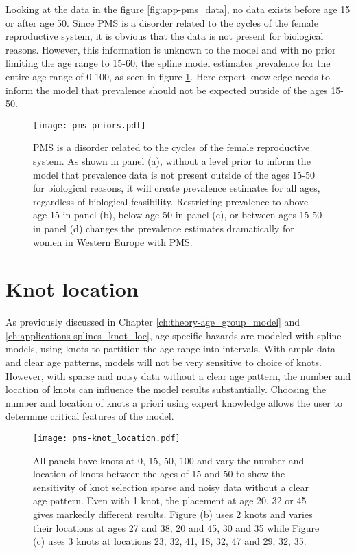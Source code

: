 Looking at the data in the figure \ref{fig:app-pms_data}, no data exists before age 15 or after age 50.  Since PMS is a disorder related to the cycles of the female reproductive system, it is obvious that the data is not present for biological reasons.  However, this information is unknown to the model and with no prior limiting the age range to 15-60, the spline model estimates prevalence for the entire age range of 0-100, as seen in figure \ref{fig:app-prios_on_level}.  Here expert knowledge needs to inform the model that prevalence should not be expected outside of the ages 15-50.

    \begin{figure}
        \begin{center}
            \texttt{[image: pms-priors.pdf]}
        \end{center}
        \caption{PMS is a disorder related to the cycles of the female reproductive system.  As shown in panel (a), without a level prior to inform the model that prevalence data is not present outside of the ages 15-50 for biological reasons, it will create prevalence estimates for all ages, regardless of biological feasibility.  Restricting prevalence to above age 15 in panel (b), below age 50 in panel (c), or between ages 15-50 in panel (d) changes the prevalence estimates dramatically for women in Western Europe with PMS.}
        \label{fig:app-prios_on_level}
    \end{figure}

\section{Knot location}
As previously discussed in Chapter \ref{ch:theory-age_group_model} and \ref{ch:applications-splines_knot_loc}, age-specific hazards are modeled with spline models, using knots to partition the age range into intervals.  With ample data and clear age patterns, models will not be very sensitive to choice of knots.  However, with sparse and noisy data without a clear age pattern, the number and location of knots can influence the model results substantially.  Choosing the number and location of knots a priori using expert knowledge allows the user to determine critical features of the model.

    \begin{figure}
        \begin{center}
            \texttt{[image: pms-knot\_location.pdf]}
        \end{center}
        \caption{All panels have knots at 0, 15, 50, 100 and vary the number and location of knots between the ages of 15 and 50 to show the sensitivity of knot selection sparse and noisy data without a clear age pattern. Even with 1 knot, the placement at age 20, 32 or 45 gives markedly different results.  Figure (b) uses 2 knots and varies their locations at ages 27 and 38, 20 and 45, 30 and 35 while Figure (c) uses 3 knots at locations {23, 32, 41}, {18, 32, 47} and {29, 32, 35}.}
        \label{fig:app-knot_loc}
    \end{figure}

